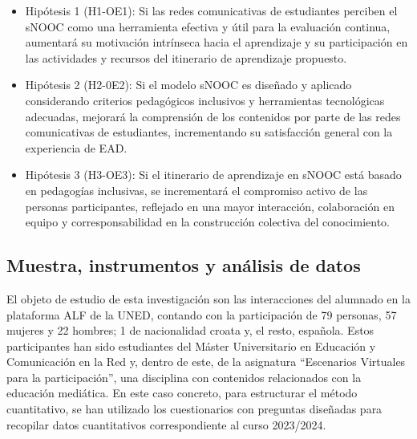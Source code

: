 \begin{itemize}
\item
Hipótesis 1 (H1-OE1): Si las redes comunicativas de estudiantes
perciben el sNOOC como una herramienta efectiva y útil para la
evaluación continua, aumentará su motivación intrínseca hacia el
aprendizaje y su participación en las actividades y recursos del
itinerario de aprendizaje propuesto.
\item
Hipótesis 2 (H2-0E2): Si el modelo sNOOC es diseñado y aplicado
considerando criterios pedagógicos inclusivos y herramientas
tecnológicas adecuadas, mejorará la comprensión de los contenidos por
parte de las redes comunicativas de estudiantes, incrementando su
satisfacción general con la experiencia de EAD.
\item
Hipótesis 3 (H3-OE3): Si el itinerario de aprendizaje en sNOOC está
basado en pedagogías inclusivas, se incrementará el compromiso activo
de las personas participantes, reflejado en una mayor interacción,
colaboración en equipo y corresponsabilidad en la construcción
colectiva del conocimiento.
\end{itemize}


\subsection{Muestra, instrumentos y análisis de
	datos}\label{sub-sec-muestrainstrumentos}
	
	El objeto de estudio de esta investigación son las interacciones del
	alumnado en la plataforma ALF de la UNED, contando con la participación
	de 79 personas, 57 mujeres y 22 hombres; 1 de nacionalidad croata y, el
	resto, española. Estos participantes han sido estudiantes del Máster
	Universitario en Educación y Comunicación en la Red y, dentro de este,
	de la asignatura ``Escenarios Virtuales para la participación'', una
	disciplina con contenidos relacionados con la educación mediática. En
	este caso concreto, para estructurar el método cuantitativo, se han
	utilizado los cuestionarios con preguntas diseñadas para recopilar datos
	cuantitativos correspondiente al curso 2023/2024.
	
